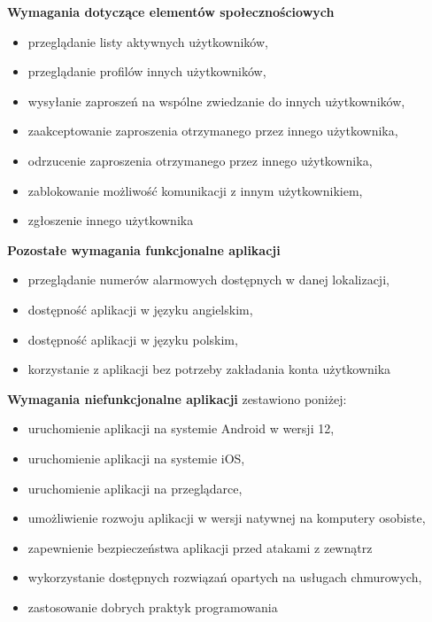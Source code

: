     \textbf{Wymagania dotyczące elementów społecznościowych}
    \begin{itemize}
        \item przeglądanie listy aktywnych użytkowników,
        \item przeglądanie profilów innych użytkowników,
        \item wysyłanie zaproszeń na wspólne zwiedzanie do innych użytkowników,
        \item zaakceptowanie zaproszenia otrzymanego przez innego użytkownika,
        \item odrzucenie zaproszenia otrzymanego przez innego użytkownika,
        \item zablokowanie możliwość komunikacji z innym użytkownikiem,
        \item zgłoszenie innego użytkownika
    \end{itemize}
    \textbf{Pozostałe wymagania funkcjonalne aplikacji}
    \begin{itemize}
        \item przeglądanie numerów alarmowych dostępnych w danej lokalizacji,
        \item dostępność aplikacji w języku angielskim,
        \item dostępność aplikacji w języku polskim,
        \item korzystanie z aplikacji bez potrzeby zakładania konta użytkownika
    \end{itemize}
    \textbf{Wymagania niefunkcjonalne aplikacji} zestawiono poniżej:
    \begin{itemize}
        \item uruchomienie aplikacji na systemie Android w wersji 12,
        \item uruchomienie aplikacji na systemie iOS,
        \item uruchomienie aplikacji na przeglądarce,
        \item umożliwienie rozwoju aplikacji w wersji natywnej na komputery osobiste,
        \item zapewnienie bezpieczeństwa aplikacji przed atakami z zewnątrz
        \item wykorzystanie dostępnych rozwiązań opartych na usługach chmurowych,
        \item zastosowanie dobrych praktyk programowania
    \end{itemize}

